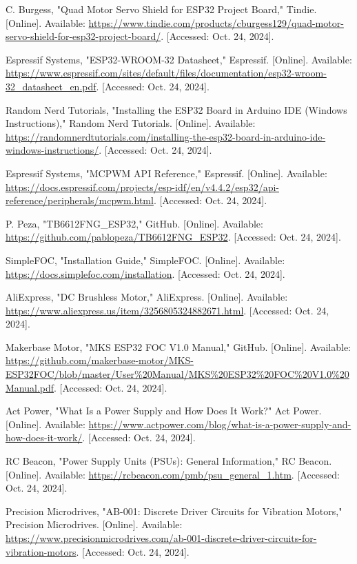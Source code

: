 \begin{thebibliography}{45}
	C. Burgess, "Quad Motor Servo Shield for ESP32 Project Board," Tindie. [Online]. Available: \url{https://www.tindie.com/products/cburgess129/quad-motor-servo-shield-for-esp32-project-board/}. [Accessed: Oct. 24, 2024]. 
	
	Espressif Systems, "ESP32-WROOM-32 Datasheet," Espressif. [Online]. Available: \url{https://www.espressif.com/sites/default/files/documentation/esp32-wroom-32_datasheet_en.pdf}. [Accessed: Oct. 24, 2024]. 
	
	Random Nerd Tutorials, "Installing the ESP32 Board in Arduino IDE (Windows Instructions)," Random Nerd Tutorials. [Online]. Available: \url{https://randomnerdtutorials.com/installing-the-esp32-board-in-arduino-ide-windows-instructions/}. [Accessed: Oct. 24, 2024]. 
	
	Espressif Systems, "MCPWM API Reference," Espressif. [Online]. Available: \url{https://docs.espressif.com/projects/esp-idf/en/v4.4.2/esp32/api-reference/peripherals/mcpwm.html}. [Accessed: Oct. 24, 2024]. 
	
	P. Peza, "TB6612FNG\_ESP32," GitHub. [Online]. Available: \url{https://github.com/pablopeza/TB6612FNG_ESP32}. [Accessed: Oct. 24, 2024]. 
	
	SimpleFOC, "Installation Guide," SimpleFOC. [Online]. Available: \url{https://docs.simplefoc.com/installation}. [Accessed: Oct. 24, 2024]. 
	
	AliExpress, "DC Brushless Motor," AliExpress. [Online]. Available: \url{https://www.aliexpress.us/item/3256805324882671.html}. [Accessed: Oct. 24, 2024]. 
	
	Makerbase Motor, "MKS ESP32 FOC V1.0 Manual," GitHub. [Online]. Available: \url{https://github.com/makerbase-motor/MKS-ESP32FOC/blob/master/User%20Manual/MKS%20ESP32%20FOC%20V1.0%20Manual.pdf}. [Accessed: Oct. 24, 2024]. 
	
	Act Power, "What Is a Power Supply and How Does It Work?" Act Power. [Online]. Available: \url{https://www.actpower.com/blog/what-is-a-power-supply-and-how-does-it-work/}. [Accessed: Oct. 24, 2024]. 
	
	RC Beacon, "Power Supply Units (PSUs): General Information," RC Beacon. [Online]. Available: \url{https://rcbeacon.com/pmb/psu_general_1.htm}. [Accessed: Oct. 24, 2024]. 
	
	Precision Microdrives, "AB-001: Discrete Driver Circuits for Vibration Motors," Precision Microdrives. [Online]. Available: \url{https://www.precisionmicrodrives.com/ab-001-discrete-driver-circuits-for-vibration-motors}. [Accessed: Oct. 24, 2024]. 
	

\end{thebibliography}
